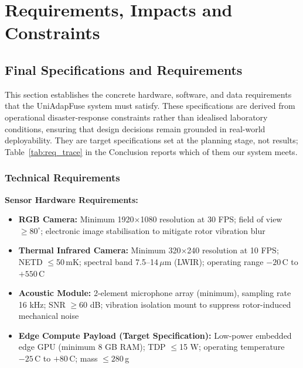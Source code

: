 \documentclass[journal]{IEEEtran}
\begin{document}
\section{Requirements, Impacts and Constraints}


\subsection{Final Specifications and Requirements}

This section establishes the concrete hardware, software, and data requirements that the UniAdapFuse system must satisfy. These specifications are derived from operational disaster-response constraints rather than idealised laboratory conditions, ensuring that design decisions remain grounded in real-world deployability. They are target specifications set at the planning stage, not results; Table~\ref{tab:req_trace} in the Conclusion reports which of them our system meets.

\subsubsection{Technical Requirements}
\label{sec:tech_requirements}

\textbf{Sensor Hardware Requirements:}
\begin{itemize}
    \item \textbf{RGB Camera:} Minimum 1920$\times$1080 resolution at 30 FPS; field of view $\geq 80^{\circ}$; electronic image stabilisation to mitigate rotor vibration blur
    \item \textbf{Thermal Infrared Camera:} Minimum 320$\times$240 resolution at 10 FPS; NETD $\leq$50\,mK; spectral band 7.5--14\,$\mu$m (LWIR); operating range $-20$\,\textdegree{}C to $+550$\,\textdegree{}C
    \item \textbf{Acoustic Module:} 2-element microphone array (minimum), sampling rate 16 kHz; SNR $\geq$60 dB; vibration isolation mount to suppress rotor-induced mechanical noise
    \item \textbf{Edge Compute Payload (Target Specification):} Low-power embedded edge GPU (minimum 8 GB RAM); TDP $\leq$15 W; operating temperature $-25$\,\textdegree C to $+80$\,\textdegree C; mass $\leq 280$\,g
\end{itemize}
\end{document}
